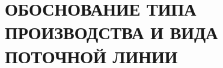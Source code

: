 \section[Обоснование типа производства и вида поточной линии]{%
  ОБОСНОВАНИЕ ТИПА ПРОИЗВОДСТВА И ВИДА \\
  ПОТОЧНОЙ ЛИНИИ
}
\label{sec:choice}

